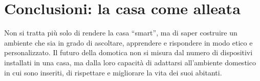 \section{Conclusioni: la casa come alleata}

Non si tratta più solo di rendere la casa “smart”, ma di saper costruire un ambiente che sia in grado di ascoltare, apprendere e rispondere in modo etico e personalizzato. Il futuro della domotica non si misura dal numero di dispositivi installati in una casa, ma dalla loro capacità di adattarsi all’ambiente domestico in cui sono inseriti, di rispettare e migliorare la vita dei suoi abitanti.

